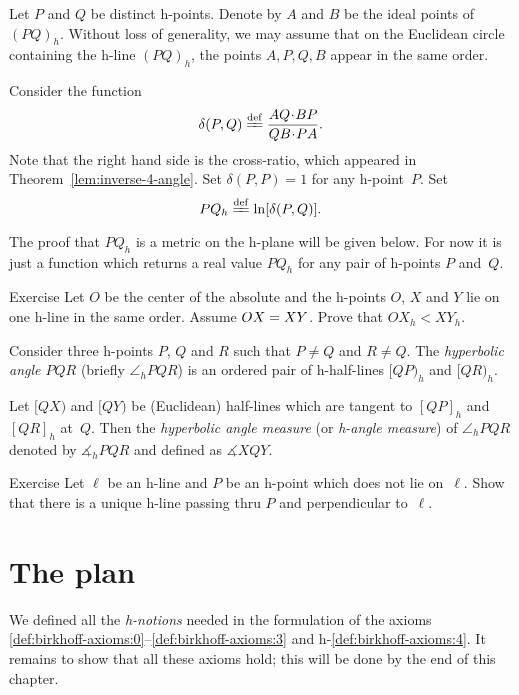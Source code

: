 \label{h-dist}
Let $P$ and $Q$ be distinct h-points.
Denote by $A$ and $B$ be the ideal points of $(PQ)_h$.
Without loss of generality, we may assume that on the Euclidean circle containing the h-line $(PQ)_h$, the points $A,P,Q,B$ appear in the same order.

Consider the function 
$$\delta(P,Q)\df\frac{AQ\cdot BP}{QB\cdot PA}.$$
Note that the right hand side is the cross-ratio, 
which appeared in Theorem~\ref{lem:inverse-4-angle}.
Set $\delta(P,P)=1$ for any h-point~$P$.
Set 
$$PQ_h\df\ln[\delta(P,Q)].$$

The proof that $PQ_h$ is a metric on the h-plane will be given below.
For now it is just a function which returns a real value $PQ_h$ for any pair of h-points $P$ and~$Q$.

\begin{thm}{Exercise}\label{ex:h-dist-eq}
Let $O$ be the center of the absolute and the h-points $O$, $X$ and $Y$ lie on one h-line in the same order.
Assume $OX\z=XY$.
Prove that $OX_h<XY_h$.
\end{thm}


\label{h-angle measure}
Consider three h-points $P$, $Q$ and $R$
such that $P\ne Q$ and $R\ne Q$.
The \emph{hyperbolic angle $PQR$} (briefly $\angle_h PQR$) is an ordered pair of h-half-lines $[QP)_h$ and $[QR)_h$.

Let $[QX)$ and $[QY)$ be (Euclidean) half-lines 
which are tangent to $[QP]_h$ and $[QR]_h$ 
at~$Q$.
Then the \emph{hyperbolic angle measure} (or \emph{h-angle measure})  of $\angle_h PQR$ denoted by
$\measuredangle_h PQR$ and defined as
$\measuredangle XQY$.

\begin{thm}{Exercise}\label{ex:h-perp-unique}
Let $\ell$ be an h-line and $P$ be an h-point which does not lie on~$\ell$.
Show that there is a unique h-line passing thru $P$ 
and perpendicular to~$\ell$.
\end{thm}

\section*{The plan}

We defined all the {}\emph{h-notions} needed in the formulation of the axioms \ref{def:birkhoff-axioms:0}--\ref{def:birkhoff-axioms:3} and h-\ref{def:birkhoff-axioms:4}.
It remains to show that all these axioms hold; 
this will be done by the end of this chapter.

